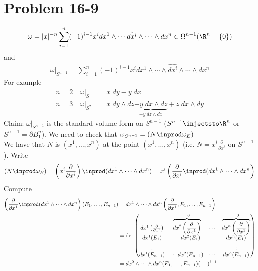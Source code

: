 \documentclass[11pt]{article}
\begin{document}
\section*{Problem 16-9}
\label{sec:org55b149d}
\begin{align*}
  \omega
  =|x|^{-n}\sum_{i=1}^{n}(-1)^{i-1}x^{i}dx^{1}\wedge\cdots\hat{dx^{i}}\wedge\cdots\wedge dx^{n}
  \in\Omega^{n-1}(\R^{n}-\{0\})
\end{align*}
and\\
\begin{align*}
  \omega|_{S^{n-1}}
  =\sum_{i=1}^{n}(-1)^{i-1}x^{i}dx^{1}\wedge\cdots\wedge\hat{dx^{i}}\wedge\cdots\wedge dx^{n}
\end{align*}
For example\\
\begin{align*}
  n=2\quad \omega|_{S^{1}}&=x\;dy-y\;dx \\
  n=3\quad \omega|_{S^{2}}&=x\;dy\wedge dz\underbrace{-y\;dx\wedge dz}_{+y\;dz\wedge dx}+z\;dx\wedge dy
\end{align*}
Claim: \(\omega|_{S^{n-1}}\) is the standard volume form on \(S^{n-1}\) (\(S^{n-1}\injectsto\R^{n}\) or \(S^{n-1}=\partial B_{1}^{n}\)). We need to check that \(\omega_{S^{n-1}}=(N\inprod\omega_{E})\)\\
We have that \(N\) is \((x^{1},\ldots,x^{n})\) at the point \((x^{1},\ldots,x^{n})\) (i.e. \(N=x^{i}\frac{\partial}{\partial x^{i}}\) on \(S^{n-1}\)). Write\\
\begin{align*}
  (N\inprod\omega_{E})
  =\left( x^{i}\frac{\partial}{\partial x^{i}} \right)\inprod(dx^{1}\wedge\cdots\wedge dx^{n})
  =x^{i}\left( \frac{\partial}{\partial x^{i}}\inprod(dx^{1}\wedge\cdots\wedge dx^{n} \right)
\end{align*}
Compute\\
\begin{align*}
  \left( \frac{\partial}{\partial x^{1}}\inprod(dx^{1}\wedge\cdots\wedge dx^{n} \right)(E_{1},\ldots,E_{n-1})
  &=dx^{1}\wedge\cdots\wedge dx^{n}\left( \frac{\partial}{\partial x^{1}},E_{1},\ldots,E_{n-1} \right) \\
  &=\operatorname{det}
  \begin{pmatrix}
    dx^{1}\left( \frac{\partial}{\partial x^{1}} \right) & \overbrace{dx^{2}\left( \frac{\partial}{\partial x^{1}} \right)}^{=0} & \cdots & \overbrace{dx^{n}\left( \frac{\partial}{\partial x^{1}} \right)}^{=0} \\
    dx^{1}(E_{1}) & \cdots dx^{2}(E_{1}) & \cdots & dx^{n}(E_{1}) \\
    \vdots & & & \vdots \\
    dx^{1}(E_{n-1}) & \cdots dx^{2}(E_{n-1}) & \cdots & dx^{n}(E_{n-1}) \\
  \end{pmatrix} \\
  &=dx^{2}\wedge\cdots\wedge dx^{n}(E_{1},\ldots,E_{n-1})(-1)^{i-1}
\end{align*}
\end{document}
